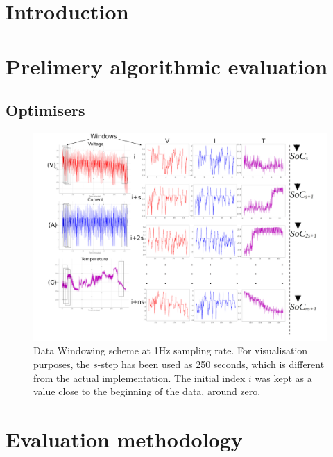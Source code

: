 \documentclass[journal,article,submit,pdftex,moreauthors]{Definitions/mdpi}
\begin{document}
\section{Introduction} \label{sec:Introduction}

\section{Prelimery algorithmic evaluation} \label{sec:Body}

    
    
    \subsection{Optimisers} \label{subsec:optimisers}
    
        
        
        
    
\startlandscape
    \begin{figure}[ht]
        \centering
        \includegraphics[width=\linewidth]{II_Body/images/windowing3f-A3.jpg}
        \caption{Data Windowing scheme at 1Hz sampling rate. For visualisation purposes, the $s$-step has been used as 250 seconds, which is different from the actual implementation. The initial index $i$ was kept as a value close to the beginning of the data, around zero.}
        \label{fig:Windowing3f}
    \end{figure}
\finishlandscape
\section{Evaluation methodology} \label{sec:Meth}

    
    
    
    
\end{document}

